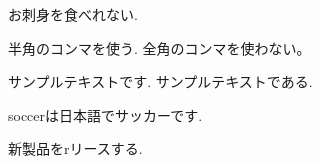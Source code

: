 \documentclass{jarticle}
\begin{document}
お刺身を食べれない.

半角のコンマを使う.
全角のコンマを使わない。

サンプルテキストです.
サンプルテキストである.

soccerは日本語でサッカーです.

新製品をrリースする.
\end{document}
